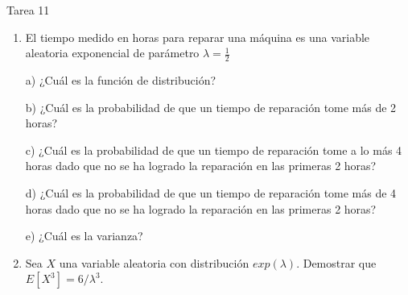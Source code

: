 \documentclass[a4paper, 12pt]{article}
\newcommand{\Pspace}{0.5cm}
\newcommand{\Aspace}{0.2cm}
\begin{document}
    \newpage
    \vspace{0.3cm}

    \begin{center}
        { \LARGE Tarea 11}
    \end{center}

    \begin{enumerate}
        \item El tiempo medido en horas para reparar una máquina es una variable aleatoria exponencial de parámetro $\lambda = \frac{1}{2}$
            \vspace{\Aspace} \par
            a) ¿Cuál es la función de distribución?
            \\ { \color{azul}  }

            \vspace{\Aspace} \par
            b) ¿Cuál es la probabilidad de que un tiempo de reparación tome más de 2 horas?
            \\ { \color{azul}  }

            \vspace{\Aspace} \par
            c) ¿Cuál es la probabilidad de que un tiempo de reparación tome a lo más 4 horas dado que no se ha logrado la reparación en las primeras 2 horas?
            \\ { \color{azul}  }

            \vspace{\Aspace} \par
            d) ¿Cuál es la probabilidad de que un tiempo de reparación tome más de 4 horas dado que no se ha logrado la reparación en las primeras 2 horas?
            \\ { \color{azul}  }

            \vspace{\Aspace} \par
            e) ¿Cuál es la varianza?
            \\ { \color{azul}  }

        \vspace{\Pspace}
    \item Sea $X$ una variable aleatoria con distribución $exp(\lambda)$. Demostrar que $E[X^{3}] = 6  / \lambda^{3}$.
            \vspace{\Aspace} \par
            { \color{azul}  }


\end{enumerate}
\end{document}
